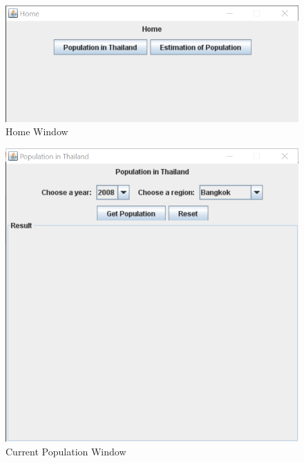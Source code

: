 \documentclass[a4paper, 11pt]{article}
\begin{document}
\begin{figure}[h]
    \centering
    \includegraphics[scale=0.75, center]{GUI Home.png}
    \caption{Home Window}
\end{figure}
\begin{figure}[h]
    \includegraphics[scale=0.75, center]{GUI CurPop.png}
    \caption{Current Population Window}
\end{figure}
\end{document}

